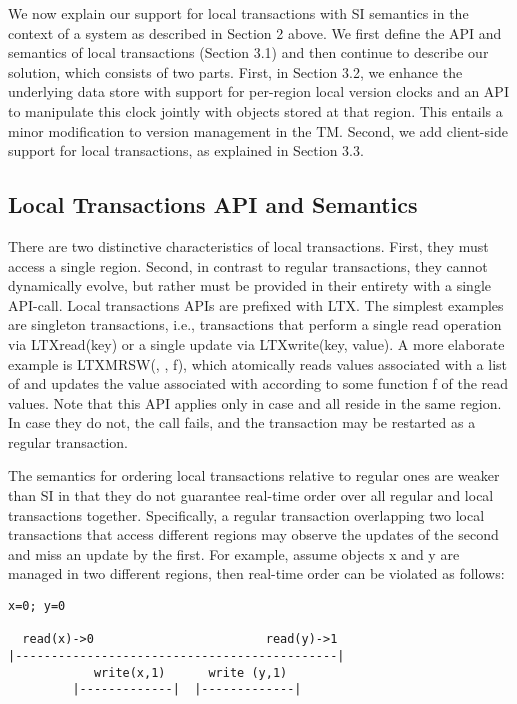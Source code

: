 

We now explain our support for local transactions with SI semantics in the
context of a system as described in Section 2 above. We first define the API and
semantics of local transactions (Section 3.1) and then continue to describe our
solution, which consists of two parts. First, in Section 3.2, we enhance the
underlying data store with support for per-region local version clocks and an
API to manipulate this clock jointly with objects stored at that region. This
entails a minor modification to version management in the TM. Second, we add
client-side support for local transactions, as explained in Section 3.3.

\subsection{Local Transactions API and Semantics}
There are two distinctive characteristics of local transactions. First, they
must access a single region. Second, in contrast to regular transactions, they
cannot dynamically evolve, but rather must be provided in their entirety with a
single API-call. Local transactions APIs are prefixed with LTX. The simplest
examples are singleton transactions, i.e., transactions that perform a single
read operation via LTXread(key) or a single update via LTXwrite(key, value). A
more elaborate example is LTXMRSW(\wkey, \rkeys, f), which atomically reads
values associated  with a list of \rkeys and updates the value associated with
\wkey according to some function f of the read values. Note that this API
applies only in case \wkey and all \rkeys reside in the same region. In case
they do not, the call fails, and the transaction may be restarted as a regular
transaction.

The semantics for ordering local transactions relative to regular ones are
weaker than SI in that they do not guarantee real-time order over all regular
and local transactions together. Specifically, a regular transaction overlapping
two local transactions that access different regions may observe the updates of
the second and miss an update by the first. For example, assume objects x and y
are managed in two different regions, then real-time order can be violated as
follows:
{\small
\begin{verbatim}
x=0; y=0

  read(x)->0                        read(y)->1
|---------------------------------------------|
            write(x,1)      write (y,1) 
         |-------------|  |-------------|
\end{verbatim}}

